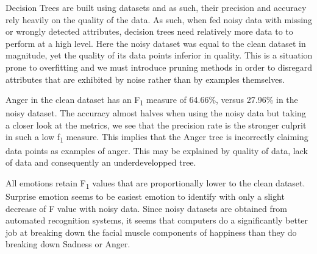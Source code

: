 Decision Trees are built using datasets and as such, their precision and accuracy rely heavily on the quality of the data.
As such, when fed noisy data with missing or wrongly detected attributes, decision trees need relatively more data to
to perform at a high level. Here the noisy dataset was equal to the clean dataset in magnitude, yet the quality of its data points
inferior in quality. This is a situation prone to overfitting and we must introduce pruning methods in order to disregard attributes
that are exhibited by noise rather than by examples themselves.

Anger in the clean dataset has an F\textsubscript{1} measure of 64.66\%, versus 27.96\% in the noisy dataset.
The accuracy almost halves when using the noisy data but taking a closer look at the metrics, we see that the precision
rate is the stronger culprit in such a low f\textsubscript{1} measure. This implies that the Anger tree is incorrectly claiming
data points as examples of anger. This may be explained by quality of data, lack of data and consequently an underdevelopped tree.

All emotions retain F\textsubscript{1} values that are proportionally lower to the clean dataset. 
Surprise emotion seems to be easiest emotion to identify with only a slight decrease of F value with noisy data.
Since noisy datasets are obtained from automated recognition systems, it seems that computers do a significantly better job at
breaking down the facial muscle components of happiness than they do breaking down Sadness or Anger.
